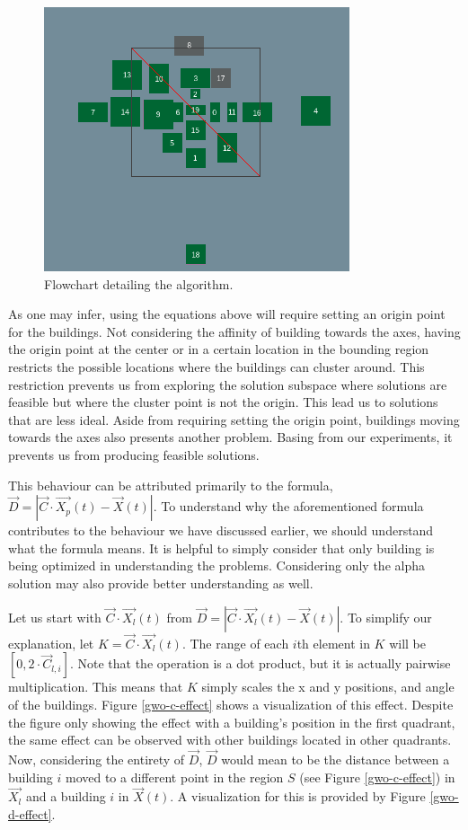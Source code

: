 \begin{figure}[h!]
	\centering
	\includegraphics{./images/chap05-methodology/bad-solution-unmodified-gwo.png}
	\caption{Flowchart detailing the algorithm.}
	\label{bad-solution-unmodified-gwo}
\end{figure}

As one may infer, using the equations above will require setting an origin point for the buildings. Not considering the affinity of building towards the axes, having the origin point at the center or in a certain location in the bounding region restricts the possible locations where the buildings can cluster around. This restriction prevents us from exploring the solution subspace where solutions are feasible but where the cluster point is not the origin. This lead us to solutions that are less ideal. Aside from requiring setting the origin point, buildings moving towards the axes also presents another problem. Basing from our experiments, it prevents us from producing feasible solutions.

This behaviour can be attributed primarily to the formula, $\vec{D} = \left | \vec{C} \cdot \vec{X_{p}}(t) - \vec{X}(t) \right |$. To understand why the aforementioned formula contributes to the behaviour we have discussed earlier, we should understand what the formula means. It is helpful to simply consider that only building is being optimized in understanding the problems. Considering only the alpha solution may also provide better understanding as well.

Let us start with $\vec{C} \cdot \vec{X_{l}}(t)$ from $\vec{D} = \left | \vec{C} \cdot \vec{X_{l}}(t) - \vec{X}(t) \right |$. To simplify our explanation, let $K = \vec{C} \cdot \vec{X_{l}}(t)$. The range of each $i$th element in $K$ will be $[0, 2 \cdot \vec{C}_{l,i}]$. Note that the operation is a dot product, but it is actually pairwise multiplication. This means that $K$ simply scales the x and y positions, and angle of the buildings. Figure \ref{gwo-c-effect} shows a visualization of this effect. Despite the figure only showing the effect with a building's position in the first quadrant, the same effect can be observed with other buildings located in other quadrants. Now, considering the entirety of $\vec{D}$, $\vec{D}$ would mean to be the distance between a building $i$ moved to a different point in the region $S$ (see Figure \ref{gwo-c-effect}) in $\vec{X_{l}}$ and a building $i$ in $\vec{X}(t)$. A visualization for this is provided by Figure \ref{gwo-d-effect}.

